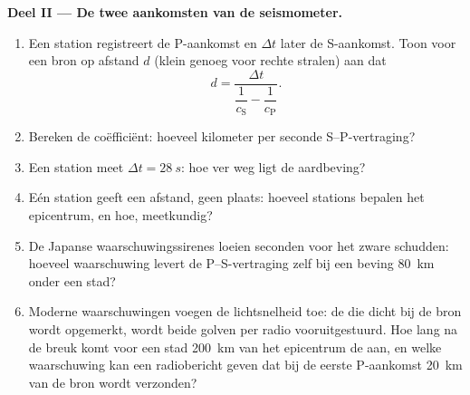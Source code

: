 \begin{problem}
\medskip\noindent\textbf{Deel II --- De twee aankomsten van de seismometer.}
\begin{enumerate}[resume]
  \item Een station registreert de P-aankomst en $\Delta t$ later de
        S-aankomst. Toon voor een bron op afstand $d$ (klein genoeg
        voor rechte stralen) aan dat
        \[
        d = \frac{\Delta t}{\dfrac{1}{c_{\text{S}}} -
        \dfrac{1}{c_{\text{P}}}} .
        \]
  \item Bereken de coëfficiënt: hoeveel kilometer per seconde
        S--P-vertraging?
  \item Een station meet $\Delta t = \qty{28}{s}$: hoe ver weg ligt de
        aardbeving?
  \item Eén station geeft een afstand, geen plaats: hoeveel stations
        bepalen het epicentrum, en hoe, meetkundig?
  \item De Japanse waarschuwingssirenes loeien seconden voor het
        zware schudden: hoeveel waarschuwing levert de P--S-vertraging
        zelf bij een beving \qty{80}{km} onder een stad?
  \item Moderne waarschuwingen voegen de lichtsnelheid toe: de 
        die dicht bij de bron wordt opgemerkt, wordt beide golven per
        radio vooruitgestuurd. Hoe lang na de breuk komt voor een stad
        \qty{200}{km} van het epicentrum de  aan, en welke
        waarschuwing kan een radiobericht geven dat bij de eerste
        P-aankomst \qty{20}{km} van de bron wordt verzonden?
\end{enumerate}


\end{problem}

